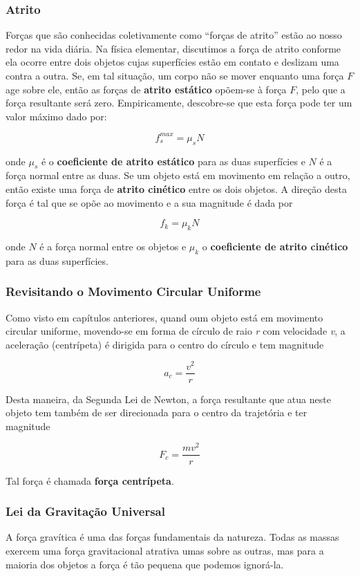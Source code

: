 \subsubsection{Atrito}
Forças que são conhecidas coletivamente como “forças de atrito” estão ao nosso redor na vida diária. Na física elementar, discutimos a força de atrito conforme ela ocorre entre dois objetos cujas
superfícies estão em contato e deslizam uma contra a outra. Se, em tal situação, um corpo não se mover enquanto uma força $F$ age sobre ele, então
as forças de \textbf{atrito estático} opõem-se à força $F$, pelo que a força resultante será zero. Empiricamente,
descobre-se que esta força pode ter um valor máximo dado por:

$$
f_s^{max}=\mu_sN
$$

onde $\mu_s$ é o \textbf{coeficiente de atrito estático} para as duas superfícies e $N$ é a força normal entre as duas.
Se um objeto está em movimento em relação a outro, então existe uma força de \textbf{atrito cinético} entre os dois objetos. A direção desta força é tal que se opõe ao movimento e a sua magnitude é dada por

$$
f_k=\mu_kN
$$

onde $N$ é a força normal entre os objetos e $\mu_k$ o \textbf{coeficiente de atrito cinético} para as duas superfícies.

\subsubsection{Revisitando o Movimento Circular Uniforme}

Como visto em capítulos anteriores, quand oum objeto está em movimento circular uniforme, movendo-se em forma de círculo de raio \emph{r} com velocidade \emph{v}, a aceleração (centrípeta) é dirigida para o centro do círculo e tem magnitude

\begin{equation}
    a_{c}=\frac{v^2}{r}
\end{equation}

Desta maneira, da Segunda Lei de Newton, a força resultante que atua neste objeto tem também de ser direcionada para o centro da trajetória e ter magnitude

\begin{equation}
    F_{c}=\frac{mv^2}{r}
\end{equation}

Tal força é chamada \textbf{força centrípeta}.

\subsubsection{Lei da Gravitação Universal}
A força gravítica é uma das forças fundamentais da natureza. Todas as massas exercem uma força gravitacional atrativa umas sobre as outras, mas para a maioria dos objetos a força é tão pequena que podemos ignorá-la.

